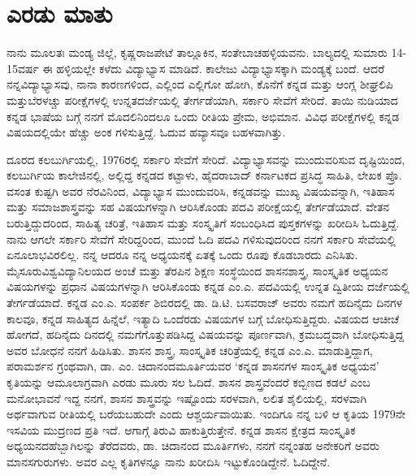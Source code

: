 
\chapter*{ಎರಡು ಮಾತು}

ನಾನು ಮೂಲತಃ ಮಂಡ್ಯ ಜಿಲ್ಲೆ, ಕೃಷ್ಣರಾಜಪೇಟೆ ತಾಲ್ಲೂಕಿನ, ಸಂತೇಬಾಚಹಳ್ಳಿಯವನು. ಬಾಲ್ಯದಲ್ಲಿ ಸುಮಾರು 14-15\break ವರ್ಷ ಈ ಹಳ್ಳಿಯಲ್ಲೇ ಕಳೆದು ವಿದ್ಯಾಭ್ಯಾಸ ಮಾಡಿದೆ. ಕಾಲೇಜು ವಿದ್ಯಾಭ್ಯಾಸಕ್ಕಾಗಿ ಮಂಡ್ಯಕ್ಕೆ ಬಂದೆ. ಆದರೆ ನನ್ನ\break ವಿದ್ಯಾಭ್ಯಾಸವು, ನಾನಾ ಕಾರಣಗಳಿಂದ, ಎಲ್ಲಿಂದ ಎಲ್ಲಿಗೋ ಹೋಗಿ, ಕೊನೆಗೆ ಕನ್ನಡ ಮತ್ತು ಆಂಗ್ಲ ಶೀಘ್ರಲಿಪಿ ಮತ್ತು\break ಬೆರಳಚ್ಚು ಪರೀಕ್ಷೆಗಳಲ್ಲಿ ಉನ್ನತದರ್ಜೆಯಲ್ಲಿ ತೇರ್ಗಡೆಯಾಗಿ, ಸರ್ಕಾರಿ ಸೇವೆಗೆ ಸೇರಿದೆ. ತಾಯಿ ನುಡಿಯಾದ ಕನ್ನಡ ಭಾಷೆಯ ಬಗ್ಗೆ ನನಗೆ ಮೊದಲಿನಿಂದಲೂ ಒಂದು ರೀತಿಯ ಪ್ರೇಮ, ಅಭಿಮಾನ. ವಿವಿಧ ಪರೀಕ್ಷೆಗಳಲ್ಲಿ ಕನ್ನಡ ವಿಷಯದಲ್ಲಿಯೇ ಹೆಚ್ಚು ಅಂಕ ಗಳಿಸುತ್ತಿದ್ದೆ. ಓದುವ ಹವ್ಯಾಸವೂ ಬಹಳವಾಗಿತ್ತು. 

ದೂರದ ಕಲಬುರ್ಗಿಯಲ್ಲಿ, 1976ರಲ್ಲಿ ಸರ್ಕಾರಿ ಸೇವೆಗೆ ಸೇರಿದೆ. ವಿದ್ಯಾಭ್ಯಾಸವನ್ನು ಮುಂದುವರಿಸುವ ದೃಷ್ಟಿಯಿಂದ, ಕಲಬುರ್ಗಿಯ ಕಾಲೇಜಿನಲ್ಲಿ, ಅಲ್ಲಿದ್ದ ಕನ್ನಡದ ಕಟ್ಟಾಳು, ಹೈದರಾಬಾದ್​ ಕರ್ನಾಟಕದ ಪ್ರಸಿದ್ಧ ಸಾಹಿತಿ, ಲೇಖಕ ಪ್ರೊ. ವಸಂತ ಕುಷ್ಟಗಿ ಅವರ ನೆರವಿನಿಂದ, ವಿದ್ಯಾಭ್ಯಾಸ ಮುಂದುವರಿಸಿ, ಕನ್ನಡವನ್ನು ಮುಖ್ಯ ವಿಷಯವನ್ನಾಗಿ, ಇತಿಹಾಸ ಮತ್ತು ಸಮಾಜಶಾಸ್ತ್ರವನ್ನು ಸಹ ವಿಷಯಗಳನ್ನಾಗಿ ಆರಿಸಿಕೊಂಡು ಪದವಿ ಪರೀಕ್ಷೆಯಲ್ಲಿ ತೇರ್ಗಡೆಯಾದೆ. ವೇತನ ಬರುತ್ತಿದ್ದುದರಿಂದ, ಸಾಹಿತ್ಯ ಚರಿತ್ರೆ, ಇತಿಹಾಸ ಮತ್ತು ಸಂಸ್ಕೃತಿಗೆ ಸಂಬಂಧಿಸಿದ ಪುಸ್ತಕಗಳನ್ನು ಖರೀದಿಸಿ ಓದುತ್ತಿದ್ದೆ. ನಾನು ಆಗಲೇ ಸರ್ಕಾರಿ ಸೇವೆಗೆ ಸೇರಿದ್ದರಿಂದ, ಮುಂದೆ ಓದಿ ಪದವಿ ಗಳಿಸುವುದರಿಂದ ನನಗೆ ಸರ್ಕಾರಿ ಸೇವೆಯಲ್ಲಿ ಏನೂ\break ಲಾಭವಿರಲಿಲ್ಲ. ನನ್ನ ಆದರೂ ನನ್ನ ಅಧ್ಯಯನಕ್ಕೆ ಏತಕ್ಕೆ ಒಂದು ರೂಪು ಕೊಡಬಾರದು ಎನಿಸಿತು. ಮೈಸೂರು\break ವಿಶ್ವವಿದ್ಯಾನಿಲಯದ ಅಂಚೆ ಮತ್ತು ತೆರಪಿನ ಶಿಕ್ಷಣ ಸಂಸ್ಥೆಯಿಂದ ಶಾಸನಶಾಸ್ತ್ರ, ಸಾಂಸ್ಕೃತಿಕ ಅಧ್ಯಯನ ವಿಷಯಗಳನ್ನು ಪ್ರಧಾನ ವಿಷಯಗಳನ್ನಾಗಿ ಆರಿಸಿಕೊಂಡು ಕನ್ನಡ ಎಂ.ಎ. ಪದವಿಯಲ್ಲಿ ಉನ್ನತ ದ್ವಿತೀಯ ದರ್ಜೆಯಲ್ಲಿ ತೇರ್ಗಡೆಯಾದೆ. ಕನ್ನಡ ಎಂ.ಎ. ಸಂಪರ್ಕ ಶಿಬಿರದಲ್ಲಿ ಡಾ. ಡಿ.ಟಿ. ಬಸವರಾಜ್​ ಅವರು ನಮಗೆ ಹದಿನೈದು ದಿನಗಳ ಕಾಲವೂ, ಕನ್ನಡ ಸಾಹಿತ್ಯದ ಹಿನ್ನೆಲೆ, ಇತ್ಯಾದಿ ಒಂದೆರಡು ವಿಷಯಗಳ ಬಗ್ಗೆ ಬೋಧಿಸುತ್ತಿದ್ದರು. ವಿಷಯದ ಆಚೀಚೆ ಹೋಗದೆ, ಹದಿನೈದು ದಿನದಲ್ಲಿ ನಮಗೆ\break ಗೊತ್ತುಪಡಿಸಿದ್ದ ವಿಷಯವನ್ನು ಪೂರ್ಣವಾಗಿ, ಕ್ರಮಬದ್ಧವಾಗಿ ಬೋಧಿಸುತ್ತಿದ್ದ ಅವರ ಬೋಧನೆ ನನಗೆ ಹಿಡಿಸಿತು. ಶಾಸನ ಶಾಸ್ತ್ರ, ಸಾಂಸ್ಕೃತಿಕ ಚರಿತ್ರೆಯಲ್ಲಿ ಕನ್ನಡ ಎಂ.ಎ. ಮಾಡುತ್ತಿದ್ದಾಗ, ಪರಾಮರ್ಶನ ಗ್ರಂಥವಾಗಿ, ಡಾ. ಎಂ. ಚಿದಾನಂದಮೂರ್ತಿಯವರ ‘ಕನ್ನಡ ಶಾಸನಗಳ ಸಾಂಸ್ಕೃತಿಕ ಅಧ್ಯಯನ’ ಕೃತಿಯನ್ನು ಆಮೂಲಾಗ್ರವಾಗಿ ಎರಡು ಮೂರು ಸಲ ಓದಿದೆ. ಶಾಸನ ಶಾಸ್ತ್ರ\-ವೆಂದರೆ ಕಬ್ಬಿಣದ ಕಡಲೆ ಎಂಬ ಮನೋಭಾವನೆ ಇದ್ದ ನನಗೆ, ಶಾಸನ ಶಾಸ್ತ್ರವನ್ನು ಇಷ್ಟೊಂದು ಸರಳ\-ವಾಗಿ, ಲಲಿತ ಶೈಲಿಯಲ್ಲಿ, ಸರಳವಾಗಿ ಅರ್ಥವಾಗುವ ರೀತಿಯಲ್ಲಿ ಬರೆಯಬಹುದೇ ಎಂದು ಆಶ್ಚರ್ಯವಾಯಿತು. ಇಂದಿಗೂ ನನ್ನ ಬಳಿ ಆ ಕೃತಿಯ 1979ನೇ ಇಸವಿಯ ಮುದ್ರಣದ ಪ್ರತಿ ಇದೆ. ಆಗಾಗ್ಗೆ ತಿರುವಿ ಹಾಕುತ್ತಿರುತ್ತೇನೆ. ಕನ್ನಡ ಶಾಸನ ಕ್ಷೇತ್ರದ ಸಾಂಸ್ಕೃತಿಕ ಅಧ್ಯಯನದ\break ಹೆಬ್ಬಾಗಿಲನ್ನು ತೆರೆದವರು, ಡಾ. ಚಿದಾನಂದ ಮೂರ್ತಿಗಳು, ನನಗೆ ನನ್ನಂತಹ ಅನೇಕರಿಗೆ ಅವರು ಮಾನಸಗುರುಗಳು. ಅವರ ಎಲ್ಲ ಕೃತಿಗಳನ್ನೂ ನಾನು ಖರೀದಿಸಿ ಇಟ್ಟುಕೊಂಡಿದ್ದೇನೆ. ಓದಿದ್ದೇನೆ.

